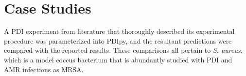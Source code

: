 



\section{Case Studies}
A PDI experiment from literature that thoroughly described its experimental procedure was parameterized into PDIpy, and the resultant predictions were compared with the reported results. These comparisons all pertain to \textit{S. aureus}, which is a model coccus bacterium that is abundantly studied with PDI and AMR infections as MRSA.




